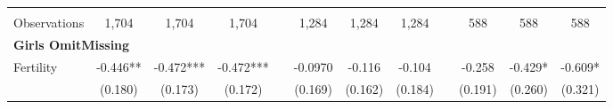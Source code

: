 \begin{landscape}
\begin{table}[htpb!]
\begin{center}
\begin{tabular}{lcccp{2mm}cccp{2mm}ccc}
\begin{footnotesize}\end{footnotesize}&\begin{footnotesize}\end{footnotesize}&\begin{footnotesize}\end{footnotesize}&\begin{footnotesize}\end{footnotesize}&\begin{footnotesize}\end{footnotesize}&\begin{footnotesize}\end{footnotesize}&\begin{footnotesize}\end{footnotesize}&\begin{footnotesize}\end{footnotesize}&\begin{footnotesize}\end{footnotesize}&\begin{footnotesize}\end{footnotesize}&\begin{footnotesize}\end{footnotesize}&\begin{footnotesize}\end{footnotesize}\\Observations&1,704&1,704&1,704&&1,284&1,284&1,284&&588&588&588\\
\multicolumn{12}{l}{\textbf{Girls OmitMissing}}\\ 
Fertility&-0.446**&-0.472***&-0.472***&&-0.0970&-0.116&-0.104&&-0.258&-0.429*&-0.609*\\
&(0.180)&(0.173)&(0.172)&&(0.169)&(0.162)&(0.184)&&(0.191)&(0.260)&(0.321)\\

\end{tabular}
\end{center}
\end{table}
\end{landscape}
